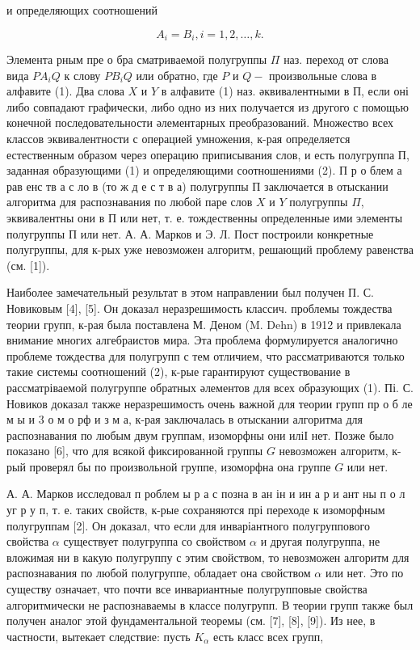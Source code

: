 \documentclass[10pt]{article}
\begin{document}
и определяющих соотношений



\[

A_{i}=B_{i}, i=1,2, \ldots, k .

\]



Элемента рным пре о бра сматриваемой полугруппы $\Pi$ наз. переход от слова вида $P A_{i} Q$ к слову $P B_{i} Q$ или обратно, где $P$ и $Q-$ произвольные слова в алфавите (1). Два слова $X$ и $Y$ в алфавите (1) наз. әквивалентными в П, если оні либо совпадают графически, либо одно из них получается из другого с помощью конечной последовательности әлементарных преобразований. Множество всех классов эквивалентности с операцией умножения, к-рая определяется естественным образом через операцию приписывания слов, и есть полугруппа П, заданная образующими (1) и определяющими соотношениями (2). П р о блем а рав енс тв а с ло в (то ж д е с т в а) полугруппы П заключается в отыскании алгоритма для распознавания по любой паре слов $X$ и $Y$ полугруппы $\Pi$, эквивалентны они в П или нет, т. е. тождественны определенные ими элементы полугруппы П или нет. А. А. Марков и Э. Л. Пост построили конкретные полугруппы, для к-рых уже невозможен алгоритм, решающий проблему равенства (см. [1]).



Наиболее замечательный результат в этом направлении был получен П. С. Новиковым [4], [5]. Он доказал неразрешимость классич. проблемы тождества теории групп, к-рая была поставлена М. Деном (M. Dehn) в 1912 и привлекала внимание многих алгебраистов мира. Эта проблема формулируется аналогично проблеме тождества для полугрупп с тем отличием, что рассматриваются только такие системы соотношений (2), к-рые гарантируют существование в рассматріваемой полугруппе обратных әлементов для всех образующих (1). Пі. С. Новиков доказал также неразрешимость очень важной для теории групп пр о б ле м ы и 3 о м о рф и з м а, к-рая заключалась в отыскании алгоритма для распознавания по любым двум группам, изоморфны они иліІ нет. Позже было показано [6], что для всякой фиксированной группы $G$ невозможен алгоритм, к-рый проверял бы по произвольной группе, изоморфна она группе $G$ или нет.



А. А. Марков исследовал п роблем ы р а с позна в ан ін и ин а р и ант ны п о л уг р у п, т. е. таких свойств, к-рые сохраняются прі переходе к изоморфным полугруппам [2]. Он доказал, что если для инваріантного полугруппового свойства $\alpha$ существует полугруппа со свойством $\alpha$ и другая полугруппа, не вложимая ни в какую полугруппу с этим свойством, то невозможен алгоритм для распознавания по любой полугруппе, обладает она свойством $\alpha$ или нет. Это по существу означает, что почти все инвариантные полугрупповые свойства алгоритмически не распознаваемы в классе полугрупп. В теории групп также был получен аналог этой фундаментальной теоремы (см. [7], [8], [9]). Из нее, в частности, вытекает следствие: пусть $K_{\alpha}$ есть класс всех групп,
\end{document}
